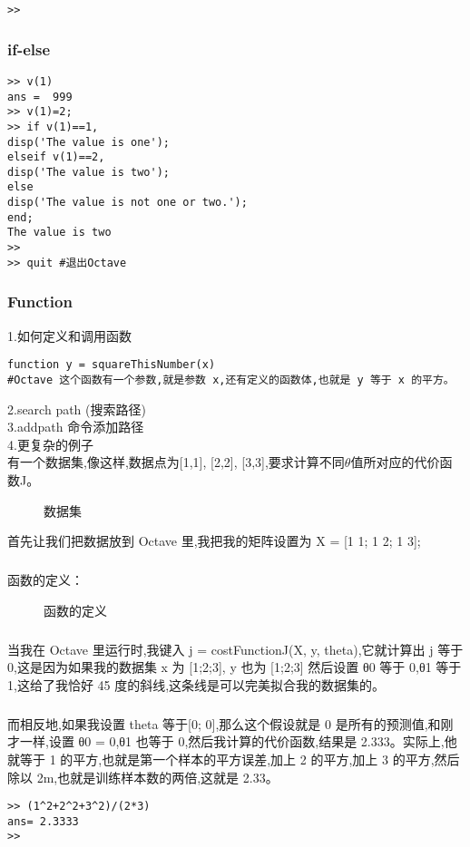 \documentclass{article}
\begin{document}
\begin{CJK}{UTF8}{gbsn}
\begin{verbatim}
>>
\end{verbatim}
\subsubsection{if-else}
\begin{verbatim}
>> v(1)
ans =  999
>> v(1)=2;
>> if v(1)==1,
disp('The value is one');
elseif v(1)==2,
disp('The value is two');
else
disp('The value is not one or two.');
end;
The value is two
>>
>> quit #退出Octave
\end{verbatim}
\subsubsection{Function}
1.如何定义和调用函数
\begin{verbatim}
function y = squareThisNumber(x)
#Octave 这个函数有一个参数,就是参数 x,还有定义的函数体,也就是 y 等于 x 的平方。
\end{verbatim}
2.search path (搜索路径)\\
3.addpath 命令添加路径\\
4.更复杂的例子\\
有一个数据集,像这样,数据点为[1,1], [2,2], [3,3],要求计算不同$\theta$值所对应的代价函数J。
\begin{figure}[H]
\caption{数据集}
\label{fig:121}
\end{figure}
首先让我们把数据放到 Octave 里,我把我的矩阵设置为 X = [1 1; 1 2; 1 3];
\subparagraph{}
函数的定义：
\begin{figure}[H]
\caption{函数的定义}
\label{fig:122}
\end{figure}
\subparagraph{}
当我在 Octave 里运行时,我键入 j = costFunctionJ(X, y, theta),它就计算出 j 等于0,这是因为如果我的数据集 x 为 [1;2;3], y 也为 [1;2;3] 然后设置 θ0 等于 0,θ1 等于1,这给了我恰好 45 度的斜线,这条线是可以完美拟合我的数据集的。
\subparagraph{}
而相反地,如果我设置 theta 等于[0; 0],那么这个假设就是 0 是所有的预测值,和刚才一样,设置 θ0 = 0,θ1 也等于 0,然后我计算的代价函数,结果是 2.333。实际上,他就等于 1 的平方,也就是第一个样本的平方误差,加上 2 的平方,加上 3 的平方,然后除以 2m,也就是训练样本数的两倍,这就是 2.33。
\begin{verbatim}
>> (1^2+2^2+3^2)/(2*3)
ans= 2.3333
>>
\end{verbatim}

\end{CJK}
\end{document}
